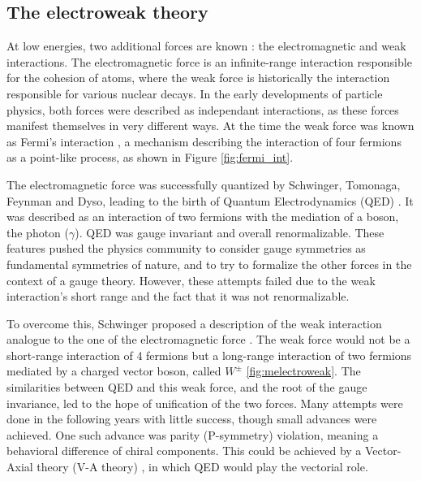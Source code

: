 \subsection{The electroweak theory}

At low energies, two additional forces are known : the electromagnetic and weak interactions. The electromagnetic force is an infinite-range interaction responsible for the cohesion of atoms, where the weak force is historically the interaction responsible for various nuclear decays. In the early developments of particle physics, both forces were described as independant interactions, as these forces manifest themselves in very different ways. At the time the weak force was known as Fermi's interaction \cite{Fermi2008}, a mechanism describing the interaction of four fermions as a point-like process, as shown in Figure \ref{fig:fermi_int}.

The electromagnetic force was successfully quantized by Schwinger, Tomonaga, Feynman and Dyso, leading to the birth of Quantum Electrodynamics (QED) \cite{PhysRev.80.440,PhysRev.76.749,PhysRev.76.769,PhysRev.74.1439,PhysRev.73.416,10.1143/PTP.1.27} . It was described as an interaction of two fermions with the mediation of a boson, the photon ($\gamma$). QED was gauge invariant and overall renormalizable. These features pushed the physics community to consider gauge symmetries as fundamental symmetries of nature, and to try to formalize the other forces in the context of a gauge theory. However, these attempts failed due to the weak interaction's short range and the fact that it was not renormalizable.

To overcome this, Schwinger proposed a description of the weak interaction analogue to the one of the electromagnetic force \cite{SCHWINGER1957407}. The weak force would not be a short-range interaction of 4 fermions but a long-range interaction of two fermions mediated by a charged vector boson, called $W^{\pm}$ \ref{fig:melectroweak}. The similarities between QED and this weak force, and the root of the gauge invariance, led to the hope of unification of the two forces. Many attempts were done in the following years with little success, though small advances were achieved. One such advance was parity (P-symmetry) violation, meaning a behavioral difference of chiral components. This could be achieved by a Vector-Axial theory (V-A theory) \cite{PhysRev.109.193,PhysRev.109.1860.2}, in which QED would play the vectorial role.

